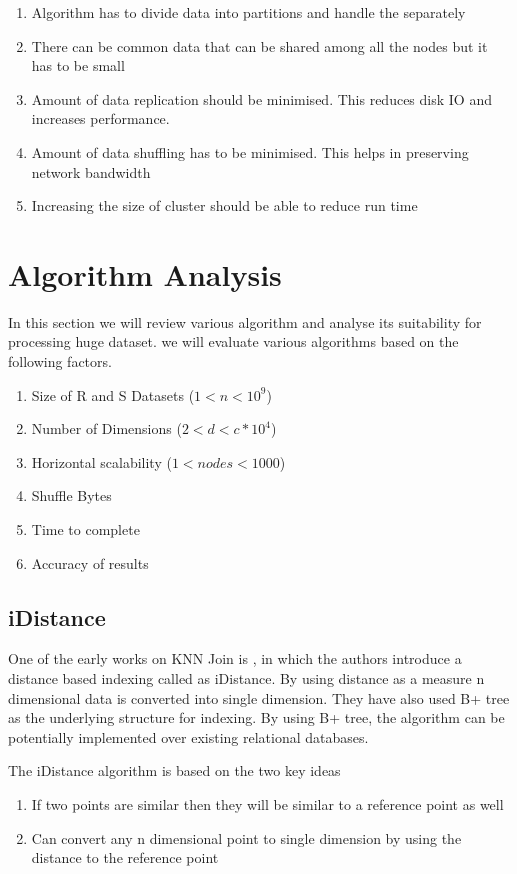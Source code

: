 \documentclass[conference]{IEEEtran}
\begin{document}
\medskip

\begin{enumerate}
\item Algorithm has to divide data into partitions and handle the separately
\item There can be common data that can be shared among all the nodes
  but it has to be small
\item Amount of data replication should be minimised. This reduces
  disk IO and increases performance.
\item Amount of data shuffling has to be minimised. This helps in
  preserving network bandwidth
\item Increasing the size of cluster should be able to reduce run time
\end{enumerate}


\section{Algorithm Analysis}
In this section we will review various algorithm and analyse its
suitability for processing huge dataset. we will evaluate various
algorithms based on the following factors.
\begin{enumerate}
\item Size of R and S Datasets ($1 < n < 10^9$)
\item Number of Dimensions ($2 < d < c*10^4$)
\item Horizontal scalability ($1 < nodes < 1000$)
\item Shuffle Bytes
\item Time to complete
\item Accuracy of results
\end{enumerate}

\bigskip
\subsection{iDistance}
One of the early works on KNN Join is \cite{jagadish_idistance:_2005}, in which the authors
introduce a distance based indexing called as iDistance. By using
distance as a measure n dimensional data is converted into single
dimension. They have also used B+ tree as the underlying structure for indexing. By using B+ tree, the
algorithm can be potentially implemented over existing relational databases.

\bigskip
The iDistance algorithm is based on the two key ideas
\begin{enumerate}
\item If two points are similar then they will be similar to a
  reference point as well
\item Can convert any n dimensional point to single dimension by using
  the distance to the reference point
\end{enumerate}
\end{document}
